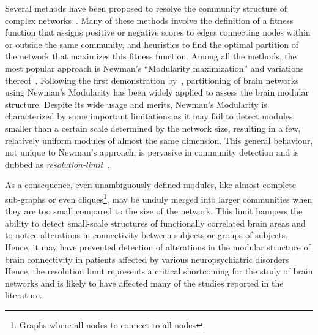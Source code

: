 \documentclass[11pt,              a4paper,              twoside,openright,              titlepage,              headinclude,footinclude,                            numbers=noenddot,              cleardoublepage=empty,]{scrreprt}
\begin{document}
Several methods have been proposed to resolve the community structure of complex networks~\cite{fortunato2010,lancichinetti2009,fortunato2016}.
Many of these methods involve the definition of a fitness function that assigns positive or negative scores to edges connecting nodes within or outside the same community, and heuristics to find the optimal partition of the network that maximizes this fitness function.
Among all the methods, the most popular approach is Newman's ``Modularity maximization'' and variations thereof~\cite{newman2006}.
Following the first demonstration by~\cite{schwarz2008}, partitioning of brain networks using Newman's Modularity has been widely applied to assess the brain modular structure.
Despite its wide usage and merits, Newman's Modularity is characterized by some important limitations as it may fail to detect modules smaller than a certain scale determined by the network size, resulting in a few, relatively uniform modules of almost the same dimension.
This general behaviour, not unique to Newman's approach, is pervasive in community detection and is dubbed as \emph{resolution-limit}~\cite{fortunato2007}.

As a consequence, even unambiguously defined modules, like almost complete sub-graphs or even cliques\footnote{Graphs where all nodes to connect to all nodes}, may be unduly merged into larger communities when they are too small compared to the size of the network.
This limit hampers the ability to detect small-scale structures of functionally correlated brain areas and to notice alterations in connectivity between subjects or groups of subjects. Hence, it may have prevented detection of alterations in the modular structure of brain connectivity in patients affected by various neuropsychiatric disorders
Hence, the resolution limit represents a critical shortcoming for the study of brain networks and is likely to have affected many of the studies reported in the literature.
\end{document}
